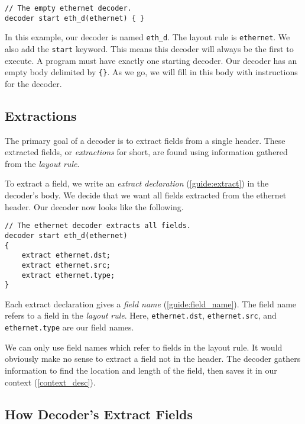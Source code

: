 \begin{codepage}
\begin{lstlisting}
// The empty ethernet decoder.
decoder start eth_d(ethernet) { }
\end{lstlisting}
\end{codepage}

In this example, our decoder is named \texttt{eth\_d}. The layout rule is \texttt{ethernet}. We also add the \texttt{start} keyword. This means this decoder will always be the first to execute. A program must have exactly one starting decoder. Our decoder has an empty body delimited by \texttt{\{\}}. As we go, we will fill in this body with instructions for the decoder.

\subsection{Extractions} \label{tut:decoder_extract}

The primary goal of a decoder is to extract fields from a single header. These extracted fields, or \textit{extractions} for short, are found using information gathered from the \textit{layout rule}.

To extract a field, we write an \textit{extract declaration} (\ref{guide:extract}) in the decoder's body. We decide that we want all fields extracted from the ethernet header. Our decoder now looks like the following.

\begin{codepage}
\begin{lstlisting}
// The ethernet decoder extracts all fields.
decoder start eth_d(ethernet)
{
	extract ethernet.dst;
	extract ethernet.src;
	extract ethernet.type;
}
\end{lstlisting}
\end{codepage}

Each extract declaration gives a \textit{field name} (\ref{guide:field_name}). The field name refers to a field in the \textit{layout rule}. Here, \texttt{ethernet.dst}, \texttt{ethernet.src}, and \texttt{ethernet.type} are our field names.

We can only use field names which refer to fields in the layout rule. It would obviously make no sense to extract a field not in the header. The decoder gathers information to find the location and length of the field, then saves it in our context (\ref{context_desc}).

\subsection{How Decoder's Extract Fields} \label{tut:extract_how}

